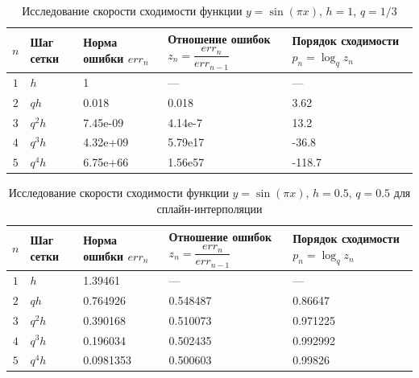 \documentclass{article}
\begin{document}
    \begin{table}[H]
        \centering
        \caption{Исследование скорости сходимости функции $y = \sin(\pi x)$, $h = 1$, $q = 1/3$}
        \begin{tabular}{|c|p{3cm}|p{3cm}|p{3cm}|p{3cm}|}
            \hline
            $n$ & Шаг сетки & Норма ошибки $err_n$ & Отношение ошибок $z_n = \dfrac{err_n}{err_{n-1}}$ & Порядок сходимости $p_n = \log_q z_n$ \\
            \hline 
            $1$ & $h$ & 1 & --- & --- \\
            \hline 
            $2$ & $qh$ &0.018 & 0.018 & 3.62\\
            \hline 
            $3$ & $q^2 h$ &7.45e-09 & 4.14e-7& 13.2\\
            \hline 
            $4$ & $q^3 h$ &  4.32e+09&5.79e17 &-36.8 \\
            \hline
            $5$ & $q^4 h$ &  6.75e+66&1.56e57 & -118.7\\
            \hline 
        \end{tabular}
    \end{table}


    \begin{table}[H]
        \centering
        \caption{Исследование скорости сходимости функции $y = \sin(\pi x)$, $h = 0.5$, $q = 0.5$ для сплайн-интерполяции}
        \begin{tabular}{|c|p{3cm}|p{3cm}|p{3cm}|p{3cm}|}
            \hline
            $n$ & Шаг сетки & Норма ошибки $err_n$ & Отношение ошибок $z_n = \dfrac{err_n}{err_{n-1}}$ & Порядок сходимости $p_n = \log_q z_n$ \\
            \hline 
            $1$ & $h$ & 1.39461 & --- & --- \\
            \hline 
            $2$ & $qh$ &0.764926 & 0.548487 & 0.86647\\
            \hline 
            $3$ & $q^2 h$ & 0.390168& 0.510073& 0.971225\\
            \hline 
            $4$ & $q^3 h$ &  0.196034&0.502435 &0.992992\\
            \hline 
            $5$ & $q^4 h$ &  0.0981353&0.500603 & 0.99826\\
            \hline 
        \end{tabular}
    \end{table}
\end{document}
